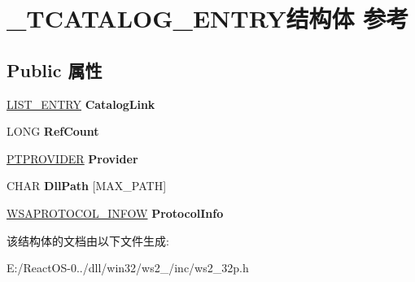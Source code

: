 \hypertarget{struct___t_c_a_t_a_l_o_g___e_n_t_r_y}{}\section{\+\_\+\+T\+C\+A\+T\+A\+L\+O\+G\+\_\+\+E\+N\+T\+R\+Y结构体 参考}
\label{struct___t_c_a_t_a_l_o_g___e_n_t_r_y}
\subsection*{Public 属性}
\begin{DoxyCompactItemize}
\item 
\mbox{\label{struct___t_c_a_t_a_l_o_g___e_n_t_r_y_a503976ec614e8345b8aea9642b09fb31}} 
\hyperlink{struct___l_i_s_t___e_n_t_r_y}{L\+I\+S\+T\+\_\+\+E\+N\+T\+RY} {\bfseries Catalog\+Link}
\item 
\mbox{\label{struct___t_c_a_t_a_l_o_g___e_n_t_r_y_a4931ee4b34df7ad1e2aef265b87b62a7}} 
L\+O\+NG {\bfseries Ref\+Count}
\item 
\mbox{\label{struct___t_c_a_t_a_l_o_g___e_n_t_r_y_a662766844e3889cbe950d178de19dd76}} 
\hyperlink{struct___t_p_r_o_v_i_d_e_r}{P\+T\+P\+R\+O\+V\+I\+D\+ER} {\bfseries Provider}
\item 
\mbox{\label{struct___t_c_a_t_a_l_o_g___e_n_t_r_y_a430dd91808b37e31e3bd6739cdcb3f46}} 
C\+H\+AR {\bfseries Dll\+Path} \mbox{[}M\+A\+X\+\_\+\+P\+A\+TH\mbox{]}
\item 
\mbox{\label{struct___t_c_a_t_a_l_o_g___e_n_t_r_y_aff3cab1768bcdc4504aa81af57f29747}} 
\hyperlink{struct___w_s_a_p_r_o_t_o_c_o_l___i_n_f_o_w}{W\+S\+A\+P\+R\+O\+T\+O\+C\+O\+L\+\_\+\+I\+N\+F\+OW} {\bfseries Protocol\+Info}
\end{DoxyCompactItemize}


该结构体的文档由以下文件生成\+:\begin{DoxyCompactItemize}
\item 
E\+:/\+React\+O\+S-\/0../dll/win32/ws2\+\_/inc/ws2\+\_\+32p.\+h\end{DoxyCompactItemize}
